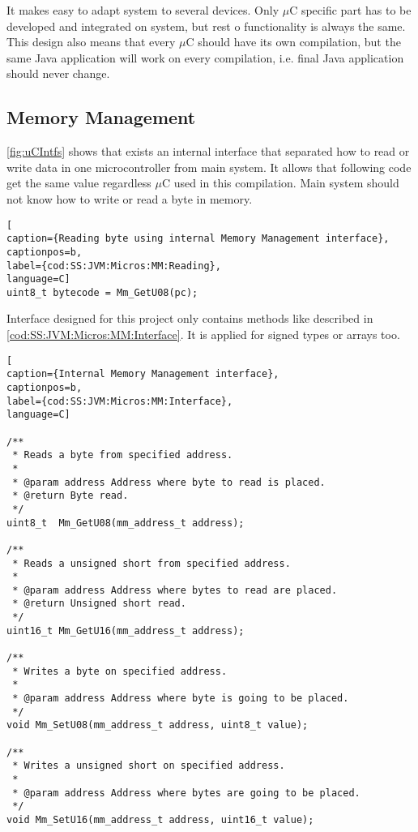 It makes easy to adapt system to several devices. Only $\mu$C specific part has to be developed and integrated on system, but rest o functionality is always the same.
This design also means that every $\mu$C should have its own compilation, but the same Java application will work on every compilation, i.e. final Java application should never change.

\subsection{Memory Management}\label{SS:JVM:Micros:MM}
\ref{fig:uCIntfs} shows that exists an internal interface that separated how to read or write data in one microcontroller from main system. It allows that following code get the same value regardless $\mu$C used in this  compilation. Main system should not know how to write or read a byte in memory.

\medskip
\begin{lstlisting}[
caption={Reading byte using internal Memory Management interface},
captionpos=b,
label={cod:SS:JVM:Micros:MM:Reading},
language=C]
uint8_t bytecode = Mm_GetU08(pc);
\end{lstlisting}
\medskip

Interface designed for this project only contains methods like described in \ref{cod:SS:JVM:Micros:MM:Interface}. It is applied for signed types or arrays too.

\medskip
\begin{lstlisting}[
caption={Internal Memory Management interface},
captionpos=b,
label={cod:SS:JVM:Micros:MM:Interface},
language=C]

/**
 * Reads a byte from specified address.
 *
 * @param address Address where byte to read is placed.
 * @return Byte read.
 */
uint8_t  Mm_GetU08(mm_address_t address);

/**
 * Reads a unsigned short from specified address.
 *
 * @param address Address where bytes to read are placed.
 * @return Unsigned short read.
 */
uint16_t Mm_GetU16(mm_address_t address);

/**
 * Writes a byte on specified address.
 *
 * @param address Address where byte is going to be placed.
 */
void Mm_SetU08(mm_address_t address, uint8_t value);

/**
 * Writes a unsigned short on specified address.
 *
 * @param address Address where bytes are going to be placed.
 */
void Mm_SetU16(mm_address_t address, uint16_t value);
\end{lstlisting}
\medskip

